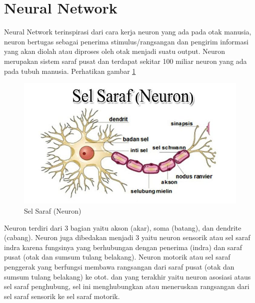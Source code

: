 \section{Neural Network}
Neural Network terinspirasi dari cara kerja neuron yang ada pada otak manusia, neuron bertugas sebagai penerima stimulus/rangsangan dan pengirim informasi yang akan diolah atau diproses oleh otak menjadi suatu output. Neuron merupakan sistem saraf pusat dan terdapat sekitar 100 miliar neuron yang ada pada tubuh manusia. Perhatikan gambar \ref{neuron}
\begin{figure}[!htbp]
        \centerline{\includegraphics[scale=.45]{figures/neuron}}
        \caption{Sel Saraf (Neuron)}
		\label{neuron}
\end{figure}

Neuron terdiri dari 3 bagian yaitu akson (akar), soma (batang), dan dendrite (cabang). Neuron juga dibedakan menjadi 3 yaitu neuron sensorik atau sel saraf indra karena fungsinya yang berhubungan dengan penerima (indra) dan saraf pusat (otak dan sumsum tulang belakang). Neuron motorik atau sel saraf penggerak yang berfungsi membawa rangsangan dari saraf pusat (otak dan sumsum tulang belakang) ke otot. dan yang terakhir yaitu neuron asosiasi ataus sel saraf penghubung, sel ini menghubungkan atau meneruskan rangsangan dari sel saraf sensorik ke sel saraf motorik.

